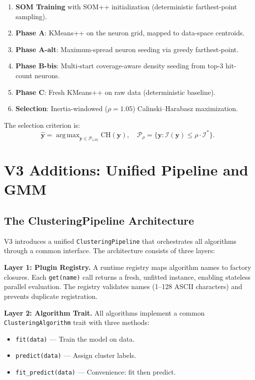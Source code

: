 \documentclass[journal]{IEEEtran}
\DeclareMathOperator*{\argmax}{arg\,max}
\begin{document}
\begin{enumerate}
\item \textbf{SOM Training} with SOM++ initialization (deterministic farthest-point sampling).
\item \textbf{Phase A}: KMeans++ on the neuron grid, mapped to data-space centroids.
\item \textbf{Phase A-alt}: Maximum-spread neuron seeding via greedy farthest-point.
\item \textbf{Phase B-bis}: Multi-start coverage-aware density seeding from top-3 hit-count neurons.
\item \textbf{Phase C}: Fresh KMeans++ on raw data (deterministic baseline).
\item \textbf{Selection}: Inertia-windowed ($\rho = 1.05$) Calinski--Harabasz maximization.
\end{enumerate}

The selection criterion is:
\begin{equation}
  \hat{\mathbf{y}} = \argmax_{\mathbf{y} \in \mathcal{P}_{1.05}} \mathrm{CH}(\mathbf{y}), \quad \mathcal{P}_\rho = \{\mathbf{y} : \mathcal{I}(\mathbf{y}) \le \rho \cdot \mathcal{I}^*\}.
\end{equation}

\section{V3 Additions: Unified Pipeline and GMM}
\label{sec:v3_additions}

\subsection{The ClusteringPipeline Architecture}

V3 introduces a unified \texttt{ClusteringPipeline} that orchestrates all algorithms through a common interface. The architecture consists of three layers:

\textbf{Layer 1: Plugin Registry.} A runtime registry maps algorithm names to factory closures. Each \texttt{get(name)} call returns a fresh, unfitted instance, enabling stateless parallel evaluation. The registry validates names (1--128 ASCII characters) and prevents duplicate registration.

\textbf{Layer 2: Algorithm Trait.} All algorithms implement a common \texttt{ClusteringAlgorithm} trait with three methods:
\begin{itemize}
  \item \texttt{fit(data)} --- Train the model on data.
  \item \texttt{predict(data)} --- Assign cluster labels.
  \item \texttt{fit\_predict(data)} --- Convenience: fit then predict.
\end{itemize}
\end{document}
